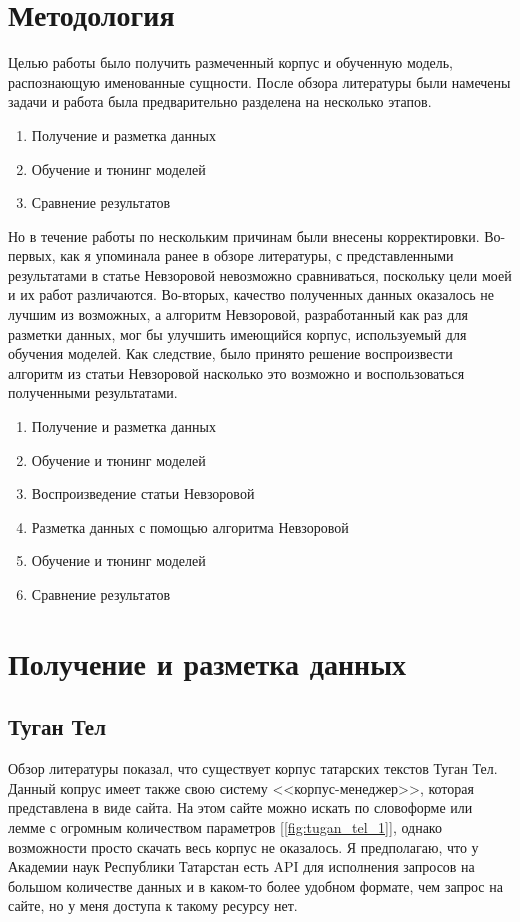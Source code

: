 \section{Методология}

Целью работы было получить размеченный корпус и обученную модель, распознающую именованные сущности. После обзора литературы были намечены задачи и работа была предварительно разделена на несколько этапов.

\begin{enumerate}
\item Получение и разметка данных
\item Обучение и тюнинг моделей
\item Сравнение результатов
\end{enumerate}

Но в течение работы по нескольким причинам были внесены корректировки. Во-первых, как я упоминала ранее в обзоре литературы, с представленными результатами в статье Невзоровой невозможно сравниваться, поскольку цели моей и их работ различаются. Во-вторых, качество полученных данных оказалось не лучшим из возможных, а алгоритм Невзоровой, разработанный как раз для разметки данных, мог бы улучшить имеющийся корпус, используемый для обучения моделей. Как следствие, было принято решение воспроизвести алгоритм из статьи Невзоровой насколько это возможно и воспользоваться полученными результатами.

\begin{enumerate}
\item Получение и разметка данных
\item Обучение и тюнинг моделей
\item Воспроизведение статьи Невзоровой
\item Разметка данных с помощью алгоритма Невзоровой
\item Обучение и тюнинг моделей
\item Сравнение результатов
\end{enumerate}


\section{Получение и разметка данных}

\subsection{Туган Тел}

Обзор литературы показал, что существует корпус татарских текстов Туган Тел\cite{tugan_tel}. Данный копрус имеет также свою систему <<корпус-менеджер>>, которая представлена в виде сайта. На этом сайте можно искать по словоформе или лемме с огромным количеством параметров [\ref{fig:tugan_tel_1}], однако возможности просто скачать весь корпус не оказалось. Я предполагаю, что у Академии наук Республики Татарстан есть API для исполнения запросов на большом количестве данных и в каком-то более удобном формате, чем запрос на сайте, но у меня доступа к такому ресурсу нет. 

